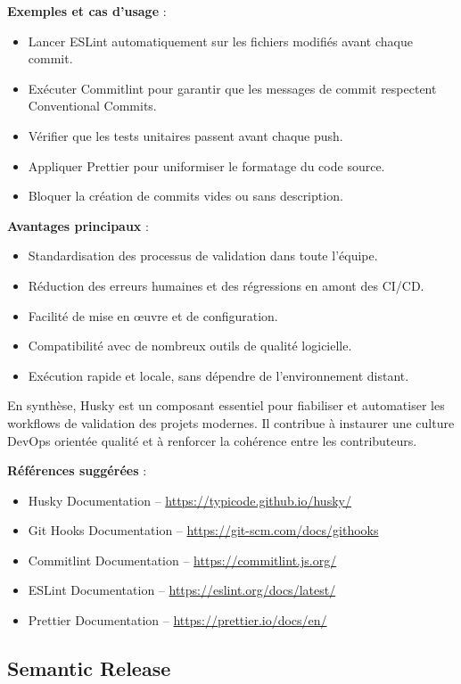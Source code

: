 \textbf{Exemples et cas d’usage} :
\begin{itemize}
	\item Lancer ESLint automatiquement sur les fichiers modifiés avant chaque commit.
	\item Exécuter Commitlint pour garantir que les messages de commit respectent Conventional Commits.
	\item Vérifier que les tests unitaires passent avant chaque push.
	\item Appliquer Prettier pour uniformiser le formatage du code source.
	\item Bloquer la création de commits vides ou sans description.
\end{itemize}

\textbf{Avantages principaux} :
\begin{itemize}
	\item Standardisation des processus de validation dans toute l’équipe.
	\item Réduction des erreurs humaines et des régressions en amont des CI/CD.
	\item Facilité de mise en œuvre et de configuration.
	\item Compatibilité avec de nombreux outils de qualité logicielle.
	\item Exécution rapide et locale, sans dépendre de l’environnement distant.
\end{itemize}

En synthèse, Husky est un composant essentiel pour fiabiliser et automatiser les workflows de validation des projets modernes. Il contribue à instaurer une culture DevOps orientée qualité et à renforcer la cohérence entre les contributeurs.

\textbf{Références suggérées} :
\begin{itemize}
	\item Husky Documentation – \url{https://typicode.github.io/husky/}
	\item Git Hooks Documentation – \url{https://git-scm.com/docs/githooks}
	\item Commitlint Documentation – \url{https://commitlint.js.org/}
	\item ESLint Documentation – \url{https://eslint.org/docs/latest/}
	\item Prettier Documentation – \url{https://prettier.io/docs/en/}
\end{itemize}


\subsection{Semantic Release}

